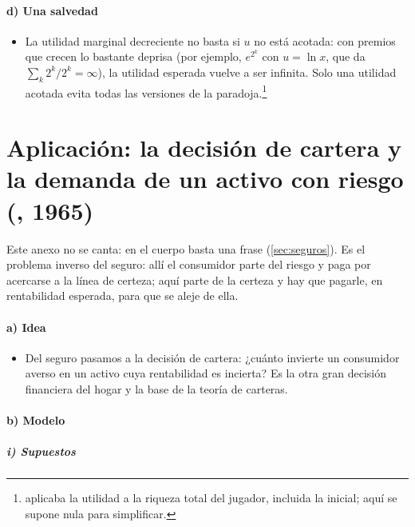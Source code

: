 \documentclass[11pt]{article}
\begin{document}
\paragraph{d) Una salvedad}

\begin{itemize}
\item La utilidad marginal decreciente no basta si $u$ no está acotada: con premios que crecen lo bastante deprisa (por ejemplo, $e^{2^k}$ con $u=\ln x$, que da $\sum_k 2^k/2^k=\infty$), la utilidad esperada vuelve a ser infinita. Solo una utilidad acotada evita todas las versiones de la paradoja\nocite{Menger1934Unsicherheitsmoment}.\footnote{ aplicaba la utilidad a la riqueza total del jugador, incluida la inicial; aquí se supone nula para simplificar.}
\end{itemize}

\section{Aplicación: la decisión de cartera y la demanda de un activo con riesgo\cortetitulo{} (, 1965)}\label{anexo:cartera}

Este anexo no se canta: en el cuerpo basta una frase (\ref{sec:seguros}). Es el problema inverso del seguro: allí el consumidor parte del riesgo y paga por acercarse a la línea de certeza; aquí parte de la certeza y hay que pagarle, en rentabilidad esperada, para que se aleje de ella.

\paragraph{a) Idea}

\begin{itemize}
\item Del seguro pasamos a la decisión de cartera: ¿cuánto invierte un consumidor averso en un activo cuya rentabilidad es incierta? Es la otra gran decisión financiera del hogar y la base de la teoría de carteras.
\end{itemize}

\paragraph{b) Modelo}

\subparagraph{i) Supuestos}
\end{document}
